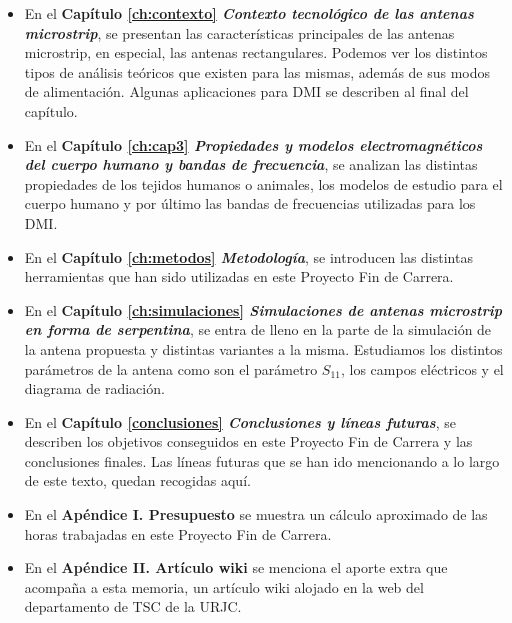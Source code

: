 \begin{itemize}
    \item En el \textbf{Capítulo \ref{ch:contexto} \textit{Contexto tecnológico de las antenas microstrip}}, se presentan las características principales de las antenas microstrip, en especial, las antenas rectangulares. Podemos ver los distintos tipos de análisis teóricos que existen para las mismas, además de sus modos de alimentación. Algunas aplicaciones para DMI se describen al final del capítulo.
    \item En el \textbf{Capítulo \ref{ch:cap3} \textit{Propiedades y modelos electromagnéticos del cuerpo humano y bandas de frecuencia}}, se analizan las distintas propiedades de los tejidos humanos o animales, los modelos de estudio para el cuerpo humano y por último las bandas de frecuencias utilizadas para los DMI.
    \item En el \textbf{Capítulo \ref{ch:metodos} \textit{Metodología}}, se introducen las distintas herramientas que han sido utilizadas en este Proyecto Fin de Carrera.
    \item En el \textbf{Capítulo \ref{ch:simulaciones} \textit{Simulaciones de antenas microstrip en forma de serpentina}}, se entra de lleno en la parte de la simulación de la antena propuesta y distintas variantes a la misma. Estudiamos los distintos parámetros de la antena como son el parámetro $S_{11}$, los campos eléctricos y el diagrama de radiación.
    \item En el \textbf{Capítulo \ref{conclusiones} \textit{Conclusiones y líneas futuras}}, se describen los objetivos conseguidos en este Proyecto Fin de Carrera y las conclusiones finales. Las líneas futuras que se han ido mencionando a lo largo de este texto, quedan recogidas aquí.
    \item En el \textbf{Apéndice I. Presupuesto} se muestra un cálculo aproximado de las horas trabajadas en este Proyecto Fin de Carrera.
    \item En el \textbf{Apéndice II. Artículo wiki} se menciona el aporte extra que acompaña a esta memoria, un artículo wiki alojado en la web del departamento de TSC de la URJC.
\end{itemize}
